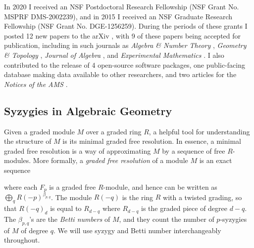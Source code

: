 \documentclass[11pt,reqno]{amsart}
\theoremstyle{remark}
\begin{document}
In 2020 I received an NSF Postdoctoral Research Fellowship (NSF Grant No. MSPRF DMS-2002239), and in 2015 I received an NSF Graduate Research Fellowship (NSF Grant No. DGE-1256259). During the periods of these grants I posted 12 new papers to the arXiv \cite{almousaBruce19,BBBKR17,bruceErman-sop,bruceLi19,bruceErmanGoldsteinYang18,bruceErman19,bruce19-semiample,bruce19-hirzebruch,BCEGLY22,bruceHellerSayrafi21,bruceHellerSayrafi22,BBCMMW22}, with 9 of these papers being accepted for publication, including in such journals as \textit{Algebra \& Number Theory} \cite{bruceErman-sop}, \textit{Geometry \& Topology} \cite{BBCMMW22}, \textit{Journal of Algebra} \cite{BCEGLY22}, and \textit{Experimental Mathematics} \cite{bruceErmanGoldsteinYang18}. I also contributed to the release of 4 open-source software packages, one public-facing database making data available to other researchers, and two articles for the \textit{Notices of the AMS} \cite{bruceNotices21,bruceNotices22}. 

\subsection{Syzygies in Algebraic Geometry}\label{subsec:prior-syzygies}

Given a graded module $M$ over a graded ring $R$, a helpful tool for understanding the structure of $M$ is its minimal graded free resolution. In essence, a minimal graded free resolution is a way of approximating $M$ by a sequence of free $R$-modules. More formally, a \textit{graded free resolution} of a module $M$ is an exact sequence 
\begin{center}
\end{center}
where each $F_{p}$ is a graded free $R$-module, and hence can be written as $\bigoplus_{q}R(-p)^{\beta_{p,q}}$. The module $R(-q)$ is the ring $R$ with a twisted grading, so that $R(-q)_{d}$ is equal to $R_{d-q}$ where $R_{d-q}$ is the graded piece of degree $d-q$. The $\beta_{p,q}$'s are the \textit{Betti numbers} of $M$, and they count the number of $p$-syzygies of $M$ of degree $q$. We will use syzygy and Betti number interchangeably throughout. 
\end{document}
